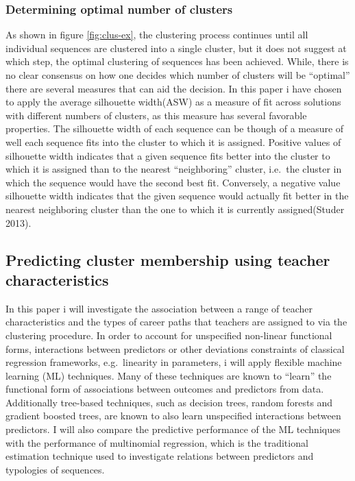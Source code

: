 \documentclass[
]{article}
\begin{document}
\hypertarget{determining-optimal-number-of-clusters}{%
\subsubsection{Determining optimal number of clusters}\label{determining-optimal-number-of-clusters}}

As shown in figure \ref{fig:clus-ex}, the clustering process continues until all individual sequences are clustered into a single cluster, but it does not suggest at which step, the optimal clustering of sequences has been achieved. While, there is no clear consensus on how one decides which number of clusters will be ``optimal'' there are several measures that can aid the decision. In this paper i have chosen to apply the average silhouette width(ASW) as a measure of fit across solutions with different numbers of clusters, as this measure has several favorable properties. The silhouette width of each sequence can be though of a measure of well each sequence fits into the cluster to which it is assigned. Positive values of silhouette width indicates that a given sequence fits better into the cluster to which it is assigned than to the nearest ``neighboring'' cluster, i.e.~the cluster in which the sequence would have the second best fit. Conversely, a negative value silhouette width indicates that the given sequence would actually fit better in the nearest neighboring cluster than the one to which it is currently assigned(Studer 2013).

\hypertarget{predicting-cluster-membership-using-teacher-characteristics}{%
\subsection{Predicting cluster membership using teacher characteristics}\label{predicting-cluster-membership-using-teacher-characteristics}}

In this paper i will investigate the association between a range of teacher characteristics and the types of career paths that teachers are assigned to via the clustering procedure. In order to account for unspecified non-linear functional forms, interactions between predictors or other deviations constraints of classical regression frameworks, e.g.~linearity in parameters, i will apply flexible machine learning (ML) techniques. Many of these techniques are known to ``learn'' the functional form of associations between outcomes and predictors from data. Additionally tree-based techniques, such as decision trees, random forests and gradient boosted trees, are known to also learn unspecified interactions between predictors. I will also compare the predictive performance of the ML techniques with the performance of multinomial regression, which is the traditional estimation technique used to investigate relations between predictors and typologies of sequences.
\end{document}
